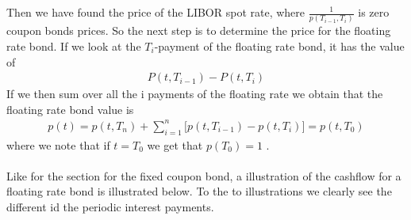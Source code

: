 Then we have found the price of the LIBOR spot rate, where $\frac{1}{p(T_{i-1},T_i)}$ is zero coupon bonds prices. 
So the next step is to determine the price for the floating rate bond. If we look at the $T_i$-payment of the floating rate bond, 
it has the value of
\begin{align*}
    P(t,T_{i-1})-P(t,T_i)
\end{align*}
If we then sum over all the i payments of the floating rate we obtain that the floating rate bond value is
\begin{align*}
    p(t)= p(t,T_n) + \sum_{i=1}^{n}\Big[p(t,T_{i-1})-p(t,T_i)\Big] = p(t,T_0) 
\end{align*}
where we note that if $t=T_0$ we get that $p(T_0)=1$ \cite{Bjork}. \\\\
Like for the section for the fixed coupon bond, a illustration of the cashflow for a floating rate bond is illustrated below.
To the to illustrations we clearly see the different id the periodic interest payments. 
\begin{center}
\end{center}
